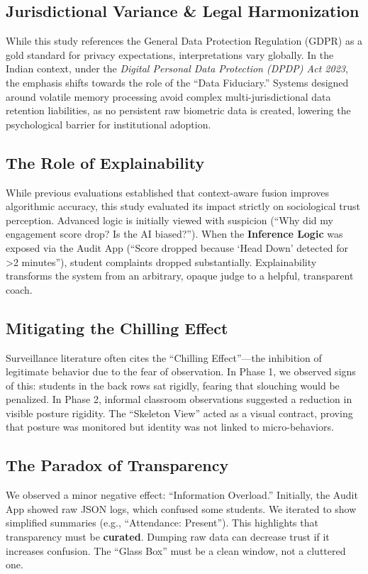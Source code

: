 \documentclass[conference]{IEEEtran}
\begin{document}
\subsection{Jurisdictional Variance \& Legal Harmonization}
While this study references the General Data Protection Regulation (GDPR) \cite{b26} as a gold standard for privacy expectations, interpretations vary globally. In the Indian context, under the \textit{Digital Personal Data Protection (DPDP) Act 2023}, the emphasis shifts towards the role of the ``Data Fiduciary.'' Systems designed around volatile memory processing avoid complex multi-jurisdictional data retention liabilities, as no persistent raw biometric data is created, lowering the psychological barrier for institutional adoption.

\subsection{The Role of Explainability}
While previous evaluations established that context-aware fusion improves algorithmic accuracy, this study evaluated its impact strictly on sociological trust perception. Advanced logic is initially viewed with suspicion (``Why did my engagement score drop? Is the AI biased?''). When the \textbf{Inference Logic} was exposed via the Audit App (``Score dropped because `Head Down' detected for >2 minutes''), student complaints dropped substantially. Explainability transforms the system from an arbitrary, opaque judge to a helpful, transparent coach.

\subsection{Mitigating the Chilling Effect}
Surveillance literature often cites the ``Chilling Effect''---the inhibition of legitimate behavior due to the fear of observation. In Phase 1, we observed signs of this: students in the back rows sat rigidly, fearing that slouching would be penalized. In Phase 2, informal classroom observations suggested a reduction in visible posture rigidity. The ``Skeleton View'' acted as a visual contract, proving that posture was monitored but identity was not linked to micro-behaviors. 

\subsection{The Paradox of Transparency}
We observed a minor negative effect: ``Information Overload.'' Initially, the Audit App showed raw JSON logs, which confused some students. We iterated to show simplified summaries (e.g., ``Attendance: Present''). This highlights that transparency must be \textbf{curated}. Dumping raw data can decrease trust if it increases confusion. The ``Glass Box'' must be a clean window, not a cluttered one.
\end{document}

